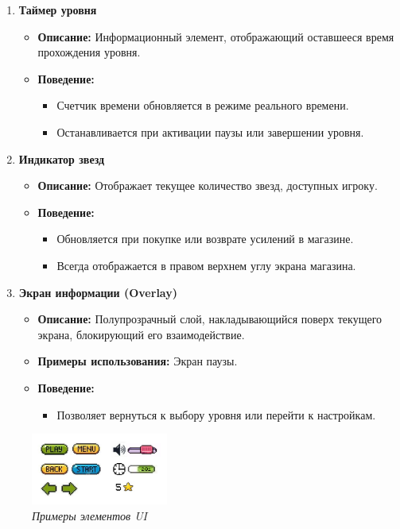 \documentclass{article}
\begin{document}
\begin{enumerate}
    \item \textbf{Таймер уровня}
    \begin{itemize}
        \item \textbf{Описание:} Информационный элемент, отображающий оставшееся время прохождения уровня.
        \item \textbf{Поведение:}
        \begin{itemize}
            \item Счетчик времени обновляется в режиме реального времени.
            \item Останавливается при активации паузы или завершении уровня.
        \end{itemize}
    \end{itemize}

    \item \textbf{Индикатор звезд}
    \begin{itemize}
        \item \textbf{Описание:} Отображает текущее количество звезд, доступных игроку.
        \item \textbf{Поведение:}
        \begin{itemize}
            \item Обновляется при покупке или возврате усилений в магазине.
            \item Всегда отображается в правом верхнем углу экрана магазина.
        \end{itemize}
    \end{itemize}

    \item \textbf{Экран информации (Overlay)}
    \begin{itemize}
        \item \textbf{Описание:} Полупрозрачный слой, накладывающийся поверх текущего экрана, блокирующий его взаимодействие.
        \item \textbf{Примеры использования:} Экран паузы.
        \item \textbf{Поведение:}
        \begin{itemize}
            \item Позволяет вернуться к выбору уровня или перейти к настройкам.
        \end{itemize}
    \end{itemize}
\end{enumerate}
\begin{figure}
    \centering
    \includegraphics[width=0.4\textwidth]{pictures/UI_elements.png}
    \caption{\textit {Примеры элементов UI}}
    \label{fig:example}
\end{figure}
\end{document}
